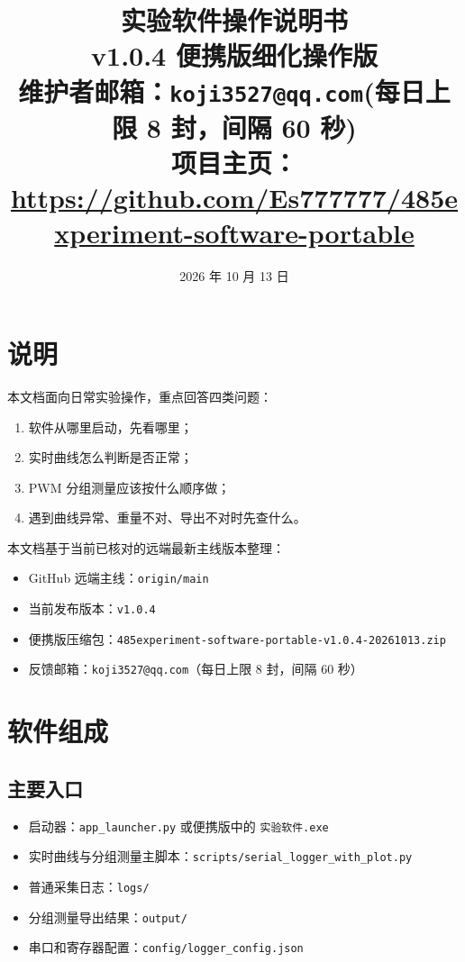 \documentclass[11pt,a4paper]{ctexart}
\title{\textbf{实验软件操作说明书}\\v1.0.4 便携版细化操作版\\
\large 维护者邮箱：\texttt{koji3527@qq.com}\quad (每日上限 8 封，间隔 60 秒)\\
\large 项目主页：\url{https://github.com/Es777777/485experiment-software-portable}}
\author{}
\date{2026 年 10 月 13 日}
\begin{document}
\maketitle
\tableofcontents
\newpage

\section{说明}

本文档面向日常实验操作，重点回答四类问题：

\begin{enumerate}[leftmargin=2em]
  \item 软件从哪里启动，先看哪里；
  \item 实时曲线怎么判断是否正常；
  \item PWM 分组测量应该按什么顺序做；
  \item 遇到曲线异常、重量不对、导出不对时先查什么。
\end{enumerate}

本文档基于当前已核对的远端最新主线版本整理：
\begin{itemize}[leftmargin=2em]
  \item GitHub 远端主线：\texttt{origin/main}
  \item 当前发布版本：\texttt{v1.0.4}
  \item 便携版压缩包：\texttt{485experiment-software-portable-v1.0.4-20261013.zip}
  \item 反馈邮箱：\texttt{koji3527@qq.com}（每日上限 8 封，间隔 60 秒）
\end{itemize}

\section{软件组成}

\subsection{主要入口}

\begin{itemize}[leftmargin=2em]
  \item 启动器：\texttt{app\_launcher.py} 或便携版中的 \texttt{实验软件.exe}
  \item 实时曲线与分组测量主脚本：\texttt{scripts/serial\_logger\_with\_plot.py}
  \item 普通采集日志：\texttt{logs/}
  \item 分组测量导出结果：\texttt{output/}
  \item 串口和寄存器配置：\texttt{config/logger\_config.json}
\end{itemize}
\end{document}
